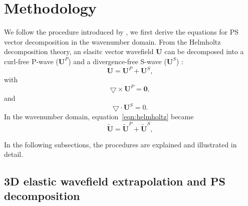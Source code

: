 \documentclass[manuscript,ulem,graphix,revised]{geophysics}
\begin{document}
\section{Methodology}
We follow the procedure introduced by \citet{zhang10}, we first derive the equations for PS vector decomposition in the wavenumber domain. From the Helmholtz decomposition theory, an elasitc vector wavefield $\boldsymbol{U}$ can be decomposed into a curl-free P-wave ($\boldsymbol{U}^P$) and a divergence-free S-wave ($\boldsymbol{U}^S$) \citep{aki80}:
\begin{equation}
\boldsymbol{U} = \boldsymbol{U}^P + \boldsymbol{U}^S,
\label{eqn:helmholtz}
\end{equation}
with 
\begin{equation}
\bigtriangledown \times \boldsymbol{U}^P = \boldsymbol{0},
\end{equation}
and
\begin{equation}
\bigtriangledown \cdot \boldsymbol{U}^S = 0.
\end{equation}
In the wavenumber domain, equation~\ref{eqn:helmholtz} became
\begin{equation}
\tilde{\boldsymbol{U}} = \tilde{\boldsymbol{U}}^P + \tilde{\boldsymbol{U}}^S,
\label{eqn:helmholtz2}
\end{equation}


In the following subsections, the procedures are explained and illustrated in detail.

\subsection{3D elastic wavefield extrapolation and PS decomposition}
\end{document}
